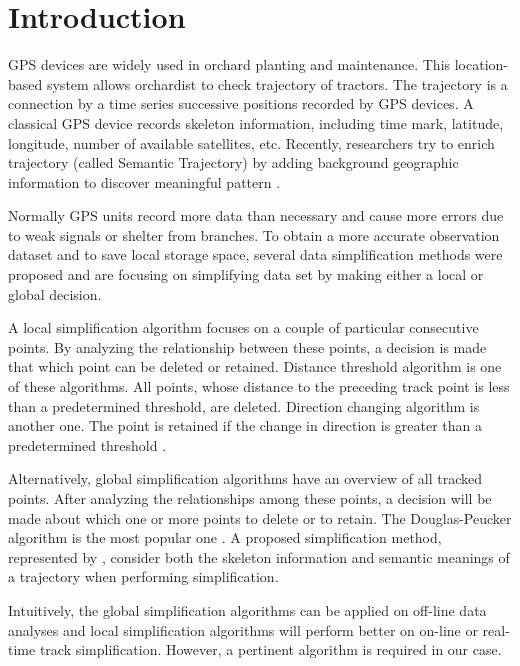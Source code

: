 
\section{Introduction}

GPS devices are widely used in orchard planting and maintenance. This location-based system allows orchardist to check trajectory of tractors. The trajectory is a connection by a time series successive positions recorded by GPS devices. A classical GPS device records skeleton information, including time mark, latitude, longitude, number of available satellites, etc. Recently, researchers try to enrich trajectory (called Semantic Trajectory) by adding background geographic information to discover meaningful pattern \citep{ying2011semantic}. 

Normally GPS units record more data than necessary and cause more errors due to weak signals or shelter from branches. To obtain a more accurate observation dataset and to save local storage space, several data simplification methods were proposed and are focusing on simplifying data set by making either a local or global decision. 

A local simplification algorithm focuses on a couple of particular consecutive points. By analyzing the relationship between these points, a decision is made that which point can be deleted or retained. Distance threshold algorithm is one of these algorithms. All points, whose distance to the preceding track point is less than a predetermined threshold, are deleted. Direction changing algorithm is another one. The point is retained if the change in direction is greater than a predetermined threshold  \citep{ivanov2012real}. 

Alternatively, global simplification algorithms have an overview of all tracked points. After analyzing the relationships among these points, a decision will be made about which one or more points to delete or to retain. The Douglas-Peucker algorithm is the most popular one  \citep{douglas1973algorithms}. A proposed simplification method, represented by \cite{chen2009trajectory}, consider both the skeleton information and semantic meanings of a trajectory when performing simplification. 


Intuitively, the global simplification algorithms can be applied on off-line data analyses and local simplification algorithms will perform better on on-line or real-time track simplification. However, a pertinent algorithm is required in our case. 


